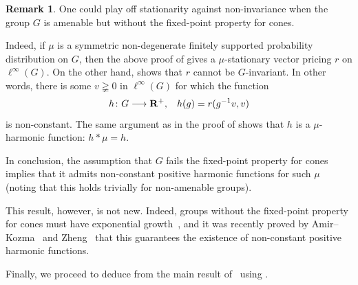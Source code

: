 \documentclass[11pt]{amsart}
\numberwithin{equation}{section}
\theoremstyle{definition}
\newtheorem{rem}[thm]{Remark}
\theoremstyle{definition}
\newcommand*{\RR}{\mathbf{R}}
\newcommand*{\inv}{^{-1}}
\newcommand*{\lra}{\longrightarrow}
\begin{document}
\begin{rem}
One could play off stationarity against non-invariance when the group $G$ is amenable but without the fixed-point property for cones.

Indeed, if $\mu$ is a symmetric non-degenerate finitely supported probability distribution on $G$, then the above proof of  gives a $\mu$-stationary vector pricing $r$ on $\ell^\infty(G)$. On the other hand,  shows that $r$ cannot be $G$-invariant. In other words, there is some $v\gneqq 0$ in $\ell^\infty(G)$ for which the function
\begin{equation*}
h\colon G \lra \RR^+, \kern3mm h(g) = r(g\inv v, v)
\end{equation*}
is non-constant. The same argument as in the proof of  shows that $h$ is a $\mu$-harmonic function: $h * \mu=h$.

In conclusion, the assumption that $G$ fails the fixed-point property for cones implies that it admits non-constant positive harmonic functions for such $\mu$ (noting that this holds trivially for non-amenable groups).

This result, however, is not new. Indeed, groups without the fixed-point property for cones must have exponential growth~\cite[\S 8]{Monod_cones}, and it was recently proved by Amir--Kozma~\cite{Amir-Kozma} and Zheng~\cite[\S 4]{Zheng_ICM} that this guarantees the existence of non-constant positive harmonic functions. 
\end{rem}



Finally, we proceed to deduce  from the main result of~\cite{Alhalimi-Hutchcroft-Pan-Tamuz-Zheng_pre} using .
\end{document}
